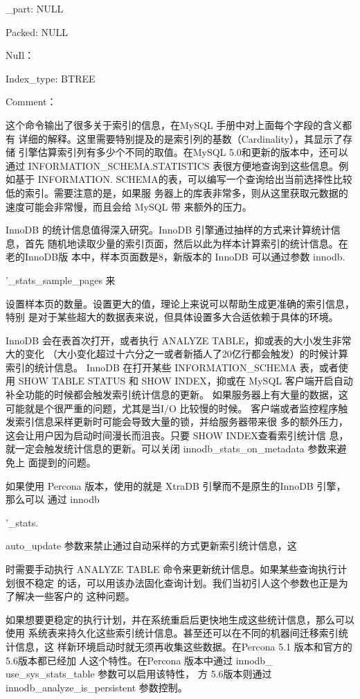 \_part: NULL

Packed: NULL

NuIl：

Index\_type: BTREE

Comment：

这个命令输出了很多关于索引的信息，在MySQL 手册中对上面每个字段的含义都有
详细的解释。这里需要特别提及的是索引列的基数（Cardinality），其显示了存储
引擎估算索引列有多少个不同的取值。在MySQL 5.0和更新的版本中，还可以通过
INFORMATION\_SCHEMA.STATISTICS 表很方便地查询到这些信息。例如基于 INFORMATION.
SCHEMA的表，可以编写一个查询给出当前选择性比较低的索引。需要注意的是，如果服
务器上的库表非常多，则从这里获取元数据的速度可能会非常慢，而且会给 MySQL 带
来额外的压力。

InnoDB 的统计信息值得深入研究。InnoDB 引擎通过抽样的方式来计算统计信息，首先
随机地读取少量的索引页面，然后以此为样本计算索引的统计信息。在老的InnoDB版
本中，样本页面数是8，新版本的 InnoDB 可以通过参数 innodb.

'\_stats\_sample\_pages 来

设置样本页的数量。设置更大的值，理论上来说可以帮助生成更准确的索引信息，特别
是对于某些超大的数据表来说，但具体设置多大合适依赖于具体的环境。

InnoDB 会在表首次打开，或者执行 ANALYZE TABLE，抑或表的大小发生非常大的变化
（大小变化超过十六分之一或者新插人了20亿行都会触发）的时候计算索引的统计信息。
InnoDB 在打开某些 INFORMATION\_SCHEMA 表，或者使用 SHOW TABLE STATUS 和 SHOW
INDEX，抑或在 MySQL 客户端开启自动补全功能的时候都会触发索引统计信息的更新。
如果服务器上有大量的数据，这可能就是个很严重的问题，尤其是当I/O 比较慢的时候。
客户端或者监控程序触发索引信息采样更新时可能会导致大量的锁，并给服务器带来很
多的额外压力，这会让用户因为启动时间漫长而沮丧。只要 SHOW INDEX查看索引统计信
息，就一定会触发统计信息的更新。可以关闭 innodb\_stats\_on\_metadata 参数来避免上
面提到的问题。

如果使用 Percona 版本，使用的就是 XtraDB 引擊而不是原生的InnoDB 引擎，那么可以
通过 innodb

'\_stats.

auto\_update 参数来禁止通过自动采样的方式更新索引统计信息，这

时需要手动执行 ANALYZE TABLE 命令来更新统计信息。如果某些查询执行计划很不稳定
的话，可以用该办法固化查询计划。我们当初引人这个参数也正是为了解决一些客户的
这种问题。

如果想要更稳定的执行计划，并在系统重启后更快地生成这些统计信息，那么可以使用
系统表来持久化这些索引统计信息。甚至还可以在不同的机器间迁移索引统计信息，这
样新环境启动时就无须再收集这些数据。在Percona 5.1 版本和官方的5.6版本都已经加
人这个特性。在Percona 版本中通过 innodb\_ use\_sys\_stats\_table 参数可以启用该特性，
方 5.6版本则通过 innodb\_analyze\_is\_persistent 参数控制。

